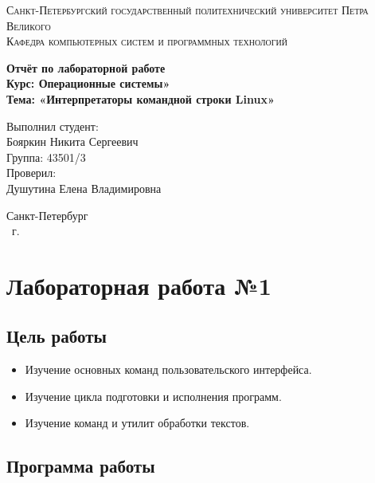 \documentclass[14pt,a4paper,report]{report}
\begin{document}
\def\contentsname{Содержание}

\begin{titlepage}
	\begin{center}
		\textsc{Санкт-Петербургский государственный политехнический 
			университет Петра Великого\\[5mm]
			Кафедра компьютерных систем и программных технологий}
		
		\vfill
		
		\textbf{Отчёт по лабораторной работе\\[3mm]
			Курс: Операционные системы»\\[6mm]
			Тема: «Интерпретаторы командной строки Linux»\\[35mm]
		}
	\end{center}
	
	\hfill
	\begin{minipage}{.5\textwidth}
		Выполнил студент:\\[2mm] 
		Бояркин Никита Сергеевич\\
		Группа: 43501/3\\[5mm]
		
		Проверил:\\[2mm] 
		Душутина Елена Владимировна
	\end{minipage}
	\vfill
	\begin{center}
		Санкт-Петербург\\ \the\year\ г.
	\end{center}
\end{titlepage}

\tableofcontents
\clearpage

\chapter{Лабораторная работа №1}

\section{Цель работы}

\begin{itemize}
	\item Изучение основных команд пользовательского интерфейса.
	\item Изучение цикла подготовки и исполнения программ.
	\item Изучение команд и утилит обработки текстов.
\end{itemize}

\section{Программа работы}
\end{document}
